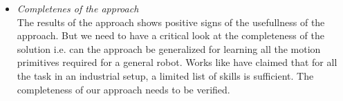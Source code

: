 \begin{itemize}
    \item \textit{Completenes of the approach} \\
The results of the approach shows positive signs of the usefullness of the approach.
But we need to have a critical look at the completeness of the solution i.e. can the
approach be generalized for learning all the motion primitives required for a general 
robot. Works like \cite{bogh_does_2012} have claimed that for all the task in an 
industrial setup, a limited list of skills is sufficient. The completeness of our 
approach needs to be verified.

\end{itemize}



